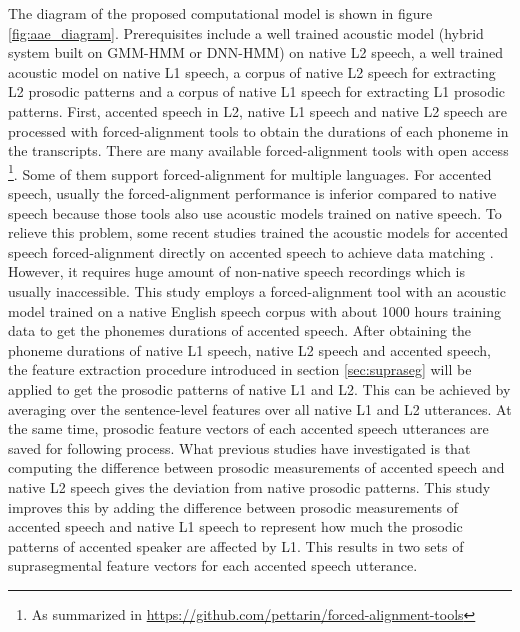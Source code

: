 The diagram of the proposed computational model is shown in figure \ref{fig:aae_diagram}. Prerequisites include a well trained acoustic model (hybrid system built on GMM-HMM or DNN-HMM) on native L2 speech, a well trained acoustic model on native L1 speech, a corpus of native L2 speech for extracting L2 prosodic patterns and a corpus of native L1 speech for extracting L1 prosodic patterns. First, accented speech in L2, native L1 speech and native L2 speech are processed with forced-alignment tools to obtain the durations of each phoneme in the transcripts. There are many available forced-alignment tools with open access \footnote{As summarized in \url{https://github.com/pettarin/forced-alignment-tools}}. Some of them support forced-alignment for multiple languages. For accented speech, usually the forced-alignment performance is inferior compared to native speech because those tools also use acoustic models trained on native speech. To relieve this problem, some recent studies trained the acoustic models for accented speech forced-alignment directly on accented speech to achieve data matching \citep{tao2016exploring, qian2017bidirectional}. However, it requires huge amount of non-native speech recordings which is usually inaccessible. This study employs a forced-alignment tool with an acoustic model trained on a native English speech corpus with about 1000 hours training data to get the phonemes durations of accented speech. After obtaining the phoneme durations of native L1 speech, native L2 speech and accented speech, the feature extraction procedure introduced in section \ref{sec:supraseg} will be applied to get the prosodic patterns of native L1 and L2. This can be achieved by averaging over the sentence-level features over all native L1 and L2 utterances. At the same time, prosodic feature vectors of each accented speech utterances are saved for following process. What previous studies have investigated is that computing the difference between prosodic measurements of accented speech and native L2 speech gives the deviation from native prosodic patterns. This study improves this by adding the difference between prosodic measurements of accented speech and native L1 speech to represent how much the prosodic patterns of accented speaker are affected by L1. This results in two sets of suprasegmental feature vectors for each accented speech utterance.

